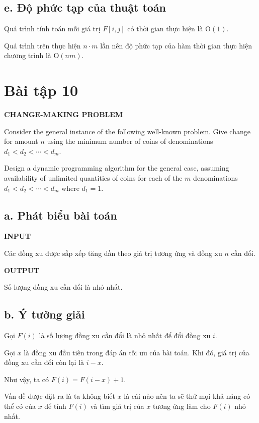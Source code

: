 \documentclass[12pt, a4paper, fleqn]{article}
\begin{document}
	\subsection*{e. Độ phức tạp của thuật toán}
	
	Quá trình tính toán mỗi giá trị $F[i, j]$ có thời gian thực hiện là O$(1)$.
	
	Quá trình trên thực hiện $n \cdot m$ lần nên độ phức tạp của hàm thời gian thực hiện chương trình là O$(nm)$.
	
	\clearpage
	
	\section*{Bài tập 10}
	
	
	\textbf{CHANGE-MAKING PROBLEM}
	
	Consider the general instance of the following well-known problem. Give change for amount $n$ using the minimum number of coins of denominations $d_1 < d_2 < \cdots < d_m$.
	
	Design a dynamic programming algorithm for the general case, assuming availability of unlimited quantities of coins for each of the $m$ denominations $d_1 < d_2 < \cdots < d_m$ where $d_1 = 1$.
	
	\subsection*{a. Phát biểu bài toán}
	
	\textbf{INPUT}
	
	Các đồng xu được sắp xếp tăng dần theo giá trị tương ứng và đồng xu $n$ cần đổi.
	
	\textbf{OUTPUT}
	
	Số lượng đồng xu cần đổi là nhỏ nhất.
	
	\subsection*{b. Ý tưởng giải}
	
	Gọi $F(i)$ là số lượng đồng xu cần đổi là nhỏ nhất để đổi đồng xu $i$.
	
	Gọi $x$ là đồng xu đầu tiên trong đáp án tối ưu của bài toán. Khi đó, giá trị của đồng xu cần đổi còn lại là $i - x$.
	
	Như vậy, ta có $F(i) = F(i - x) + 1$.
	
	Vấn đề được đặt ra là ta không biết $x$ là cái nào nên ta sẽ thử mọi khả năng có thể có của $x$ để tính $F(i)$ và tìm giá trị của $x$ tương ứng làm cho $F(i)$ nhỏ nhất.
	
\end{document}
